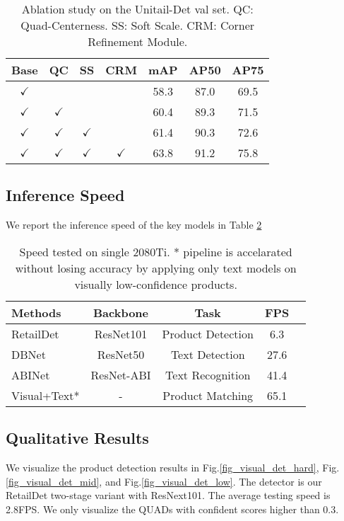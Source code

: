 \documentclass[runningheads]{llncs}
\begin{document}
\begin{table}[t]
\centering
\begin{tabular}{cccc|ccc}
\hline \hline
Base      &QC & SS & CRM & mAP  & AP50 & AP75 \\ \hline
$\checkmark$    &   &    &          & 58.3 & 87.0 & 69.5  \\
$\checkmark$ &$\checkmark$&&       & 60.4 & 89.3 & 71.5  \\
$\checkmark$ &$\checkmark$&$\checkmark$&&61.4&90.3&72.6 \\
$\checkmark$ &$\checkmark$&$\checkmark$&$\checkmark$&63.8& 91.2 & 75.8 \\
\hline
\end{tabular}
\caption{Ablation study on the Unitail-Det val set. QC: Quad-Centerness. SS: Soft Scale. CRM: Corner Refinement Module.}
\label{table_ablation_retaildet}
\end{table}

\subsection{Inference Speed}
We report the inference speed of the key models in Table \ref{table:Inferencetime}
\begin{table}[]
\centering
\begin{tabular}{l|cccc}
\hline \hline
Methods         & Backbone &Task                  & FPS   \\ \hline
RetailDet       & ResNet101 & Product Detection   & 6.3    \\
DBNet           & ResNet50 & Text Detection       & 27.6    \\
ABINet          & ResNet-ABI & Text Recognition     & 41.4   \\
Visual+Text*       & -   & Product Matching          &  65.1   \\
 \hline
\end{tabular}
\caption{Speed tested on single 2080Ti. * pipeline is accelarated without losing accuracy by applying only text models on visually low-confidence products.}
\label{table:Inferencetime}
\end{table}


\subsection{Qualitative Results}
We visualize the product detection results in Fig.\ref{fig_visual_det_hard}, Fig.\ref{fig_visual_det_mid}, and Fig.\ref{fig_visual_det_low}. The detector is our RetailDet two-stage variant with ResNext101. The average testing speed is 2.8FPS. We only visualize the QUADs with confident scores higher than 0.3. 
\end{document}
